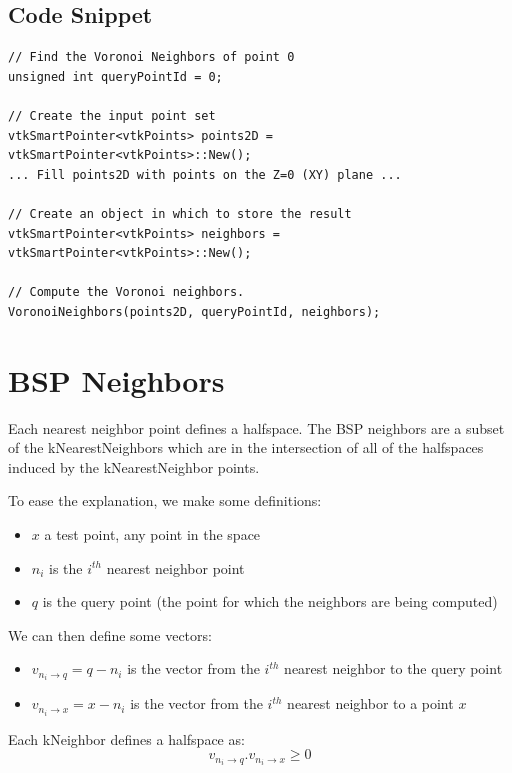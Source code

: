 \documentclass{InsightArticle}
\begin{document}
\subsection{Code Snippet}

\begin{verbatim}
// Find the Voronoi Neighbors of point 0
unsigned int queryPointId = 0;

// Create the input point set
vtkSmartPointer<vtkPoints> points2D = vtkSmartPointer<vtkPoints>::New();
... Fill points2D with points on the Z=0 (XY) plane ...

// Create an object in which to store the result
vtkSmartPointer<vtkPoints> neighbors = vtkSmartPointer<vtkPoints>::New();

// Compute the Voronoi neighbors.
VoronoiNeighbors(points2D, queryPointId, neighbors);
\end{verbatim}


\section{BSP Neighbors}
Each nearest neighbor point defines a halfspace. The BSP neighbors are a subset of the kNearestNeighbors
which are in the intersection of all of the halfspaces induced by the kNearestNeighbor points.

To ease the explanation, we make some definitions:

\begin{itemize}
 \item $x$ a test point, any point in the space
 \item $n_i$ is the $i^{th}$ nearest neighbor point
 \item $q$ is the query point (the point for which the neighbors are being computed)
\end{itemize}

We can then define some vectors:

\begin{itemize}
 \item $v_{n_i\rightarrow q} = q - n_i$ is the vector from the $i^{th}$ nearest neighbor to the query point
 \item $v_{n_i\rightarrow x} = x - n_i$ is the vector from the $i^{th}$ nearest neighbor to a point $x$
\end{itemize}

Each kNeighbor defines a halfspace as:
\begin{equation}
v_{n_i\rightarrow q}.v_{n_i\rightarrow x} \geq 0
\end{equation}
\end{document}
